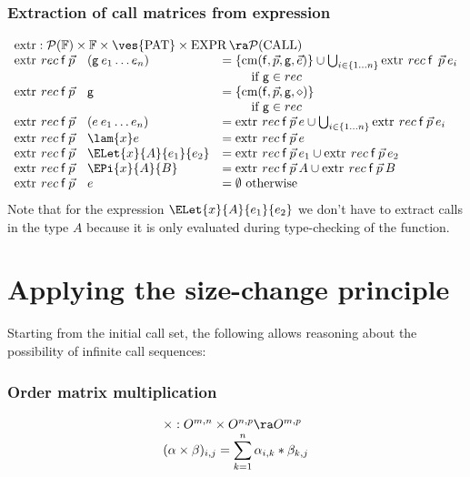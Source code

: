 \subsubsection{Extraction of call matrices from expression}
\[
\begin{array}[t]{ll}
\multicolumn{2}{l}{\extr : \pset{\cF} \times \cF \times \ves{\Pat} \times \Expr \ra \pset{\call}}\\ 
\extr \: rec \: \ff \: \vec{p} \quad (\fg \: e_1 \ldots e_n) & = \{ \cm (\ff,\vec{p},\fg,\vec{e}) \} \cup \bigcup_{i \in \{ 1 \ldots n \}} \extr \: rec \: \ff \: \: \vec{p} \: e_i \\
& \qquad \mbox{ if }  \fg \in rec \\
\extr \: rec \: \ff \: \vec{p} \quad \fg & =  \{ \cm (\ff,\vec{p},\fg,\diamond) \} \\
& \qquad \mbox{ if }  \fg \in rec\\
\extr \: rec \: \ff \: \vec{p} \quad (e \: e_1 \ldots e_n) & =  \extr \: rec \: \ff \: \vec{p} \: e \cup \bigcup_{i \in \{ 1 \ldots n \}} \extr \: rec \: \ff \: \vec{p} \: e_i\\ 
\extr \: rec \: \ff \: \vec{p} \quad \lam{x}e & = \extr \: rec \: \ff \: \vec{p} \: e \\
\extr \: rec \: \ff \: \vec{p} \quad \ELet{x}{A}{e_1}{e_2} & = \extr \: rec \: \ff \: \vec{p} \: e_1 \cup \extr \: rec \: \ff \: \vec{p} \: e_2 \\
\extr \: rec \: \ff \: \vec{p} \quad \EPi{x}{A}{B} & =  \extr \: rec \: \ff \: \vec{p} \: A \cup \extr \: rec \: \ff \: \vec{p} \: B \\ 
\extr \: rec \: \ff \: \vec{p} \quad e & = \emptyset \mbox{ otherwise}   
\end{array}
\]
Note that for the expression $\ELet{x}{A}{e_1}{e_2}$ we don't have to extract calls in the type $A$ because it is only evaluated during type-checking of the function.  

\section{Applying the size-change principle}

Starting from the initial call set, the following allows reasoning about the possibility of infinite call sequences:

\subsubsection{Order matrix multiplication}
\[ 
\begin{array}[t]{l}
\times : O^{m,n} \times O^{n,p} \ra O^{m,p} \\
   (\alpha \times \beta)_{i,j} = \displaystyle\sum^{n}_{k=1}{\alpha_{i,k} * \beta_{k,j}}
\end{array}
\]

